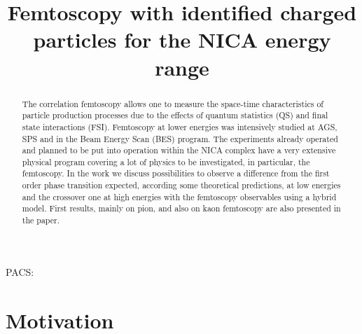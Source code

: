 \documentclass[a4paper]{panl}
\begin{document}

\title{Femtoscopy with identified charged particles for the NICA energy range}
\maketitle
{}
\vspace{-3mm}
\vspace{-3mm}
\vspace{-3mm}


\begin{abstract}
  The correlation femtoscopy allows one to measure the space-time characteristics of particle production processes
  due to the effects of quantum statistics (QS) and final state interactions (FSI).
  Femtoscopy at lower energies was intensively studied at AGS, SPS and in the Beam Energy Scan (BES) program.
  The experiments already operated and planned to be put into operation within the NICA complex have a very extensive physical program covering a lot of physics to be investigated,
  in particular, the femtoscopy. In the work we discuss possibilities to observe a difference from the first order phase transition expected, according some theoretical predictions,
  at low energies
  and  the  crossover  one  at  high energies  with the femtoscopy observables using a hybrid model.
  First results, mainly on pion, and also on kaon femtoscopy are also presented  in the paper.
\end{abstract}
\vspace*{6pt}

\noindent
PACS:

\vspace{-6mm}
\label{sec:intro}
\section*{Motivation}
\end{document}
